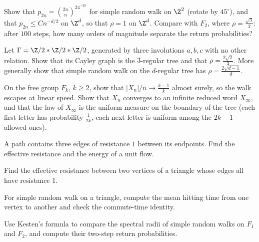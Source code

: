 \begin{exercise}[$\star\star$]\label{ex:znreturn}
Show that $p_{2n}=\binom{2n}n^24^{-2n}$ for simple random walk on $\Z^2$ (rotate by $45^\circ$), and that $p_{2n}\le Cn^{-d/2}$ on $\Z^d$, so that $\rho=1$ on $\Z^d$. Compare with $F_2$, where $\rho=\frac{\sqrt3}2$: after $100$ steps,
how many orders of magnitude separate the return probabilities?
\end{exercise}

\begin{exercise}[$\star\star$]\label{ex:regulartree}
Let $\Gamma=\Z/2*\Z/2*\Z/2$, generated by three involutions $a,b,c$ with no other relation. Show that its Cayley graph is the $3$-regular tree and that $\rho=\frac{2\sqrt2}3$. More generally show that simple random walk on the
$d$-regular tree has $\rho=\frac{2\sqrt{d-1}}d$.
\end{exercise}

\begin{exercise}[$\star\star\star$]\label{ex:speed}
On the free group $F_k$, $k\ge2$, show that $|X_n|/n\to\frac{k-1}k$ almost surely, so the walk escapes at linear speed. Show that $X_n$ converges to an infinite reduced word $X_\infty$, and that the law of $X_\infty$ is the
uniform measure on the boundary of the tree (each first letter has probability $\frac1{2k}$, each next letter is uniform among the $2k-1$ allowed ones).
\end{exercise}

\begin{exercise}[$\star$]\label{ex:v12seriesres}
A path contains three edges of resistance $1$ between its endpoints. Find the effective resistance and the energy of a unit flow.
\end{exercise}

\begin{exercise}[$\star$]\label{ex:v12triangleres}
Find the effective resistance between two vertices of a triangle whose edges all have resistance $1$.
\end{exercise}

\begin{exercise}[$\star\star$]\label{ex:v12trianglecommute}
For simple random walk on a triangle, compute the mean hitting time from one vertex to another and check the commute-time identity.
\end{exercise}

\begin{exercise}[$\star\star\star$]\label{ex:v12kestenspecial}
Use Kesten's formula to compare the spectral radii of simple random walks on $F_1$ and $F_2$, and compute their two-step return probabilities.
\end{exercise}

